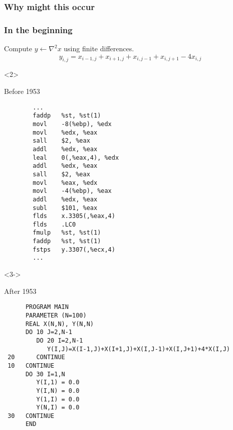 \documentclass[presentation]{beamer}
\begin{document}
\begin{frame}
  \frametitle{Why might this occur}


\end{frame}

\begin{frame}[fragile, t]
  \frametitle{In the beginning}
  Compute $y \leftarrow \nabla^2 x$ using finite differences.
  \begin{equation*}
    y_{i,j} = x_{i-1, j} + x_{i+1, j} + x_{i, j-1} + x_{i, j+1} - 4x_{i,j}    
  \end{equation*}

  \begin{onlyenv}<2>
    \begin{block}{Before 1953}
\begin{verbatim}
        ...
        faddp   %st, %st(1)
        movl    -8(%ebp), %edx
        movl    %edx, %eax
        sall    $2, %eax
        addl    %edx, %eax
        leal    0(,%eax,4), %edx
        addl    %edx, %eax
        sall    $2, %eax
        movl    %eax, %edx
        movl    -4(%ebp), %eax
        addl    %edx, %eax
        subl    $101, %eax
        flds    x.3305(,%eax,4)
        flds    .LC0
        fmulp   %st, %st(1)
        faddp   %st, %st(1)
        fstps   y.3307(,%ecx,4)
        ...
\end{verbatim}
    \end{block}
  \end{onlyenv}
  \begin{onlyenv}<3->
    \begin{block}{After 1953}
\begin{verbatim}
      PROGRAM MAIN
      PARAMETER (N=100)
      REAL X(N,N), Y(N,N)
      DO 10 J=2,N-1
         DO 20 I=2,N-1
            Y(I,J)=X(I-1,J)+X(I+1,J)+X(I,J-1)+X(I,J+1)+4*X(I,J)
 20      CONTINUE
 10   CONTINUE
      DO 30 I=1,N
         Y(I,1) = 0.0
         Y(I,N) = 0.0
         Y(1,I) = 0.0
         Y(N,I) = 0.0
 30   CONTINUE
      END
\end{verbatim}
    \end{block}
  \end{onlyenv}
\end{frame}
\end{document}
